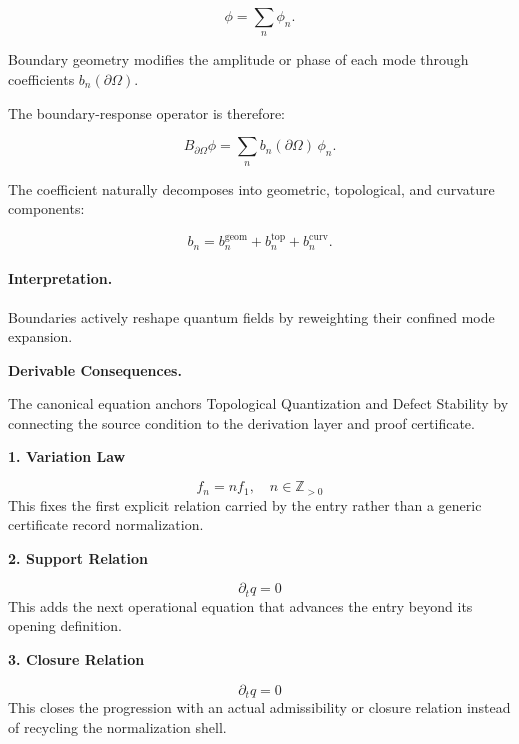 \begin{equation}
\phi=\sum_n \phi_n .
\end{equation}

Boundary geometry modifies the amplitude or phase of each mode through coefficients $b_n(\partial\Omega)$.

The boundary-response operator is therefore:

\begin{equation}
\boxed{
B_{\partial\Omega}\phi
=
\sum_n b_n(\partial\Omega)\,\phi_n .
}
\end{equation}

The coefficient naturally decomposes into geometric, topological, and curvature components:

\begin{equation}
b_n
=
b_n^{\mathrm{geom}}
+
b_n^{\mathrm{top}}
+
b_n^{\mathrm{curv}} .
\end{equation}

\paragraph{Interpretation.}
Boundaries actively reshape quantum fields by reweighting their confined mode expansion.

\par\vspace{0.35em}
\noindent\textbf{Derivable Consequences.}\quad
\begingroup
\footnotesize
\raggedright
The canonical equation anchors Topological Quantization and Defect Stability by connecting the source condition to the derivation layer and proof certificate.
\par\endgroup

\noindent\textbf{1. Variation Law}\par
\[
f_{n}=n f_{1},\quad n\in\mathbb{Z}_{>0}
\]
\noindent This fixes the first explicit relation carried by the entry rather than a generic certificate record normalization.\par
\noindent\textbf{2. Support Relation}\par
\[
\partial_t q=0
\]
\noindent This adds the next operational equation that advances the entry beyond its opening definition.\par
\noindent\textbf{3. Closure Relation}\par
\[
\partial_t q=0
\]
\noindent This closes the progression with an actual admissibility or closure relation instead of recycling the normalization shell.\par

